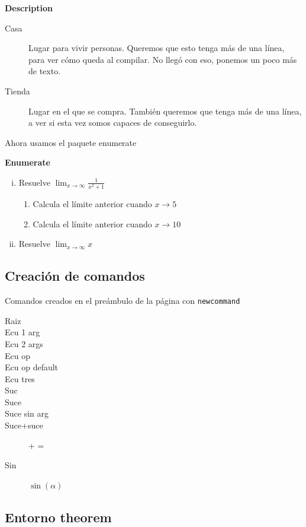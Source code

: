 \textbf{Description}
\begin{description}
	\item[Casa] Lugar para vivir personas. Queremos que esto tenga más de una línea, para ver cómo queda al compilar. No llegó con eso, ponemos un poco más de texto.
	\item[Tienda] Lugar en el que se compra. También queremos que tenga más de una línea, a ver si esta vez somos capaces de conseguirlo.
	
\end{description}

Ahora usamos el paquete enumerate

\textbf{Enumerate}
\begin{enumerate}[i).-]
	\item Resuelve $\lim_{x\to \infty}\frac{1}{x^2+1}$
	\begin{enumerate}[1;]
		\item Calcula el límite anterior cuando $x\to 5$
		\item Calcula el límite anterior cuando $x\to 10$
	\end{enumerate} 
	\item Resuelve $\lim_{x\to \infty} x$
\end{enumerate}

\subsection{Creación de comandos}

Comandos creados en el preámbulo de la página con \verb*|newcommand|

\begin{description}
	\item[Raiz] \raiz
	\item[Ecu 1 arg] 
	\item[Ecu 2 args] 
	\item[Ecu op] \ecuop[\phi+1]
	\item[Ecu op default] \ecuop
	\item[Ecu tres] 
	\item[Suc] \suc
	\item[Suce] \suce[A]
	\item[Suce sin arg] \suce
	\item[Suce+suce] \suce[a] + \suce[b] = \suce
	\item[Sin] $\sin(\alpha)$
\end{description}

\subsection{Entorno theorem}

